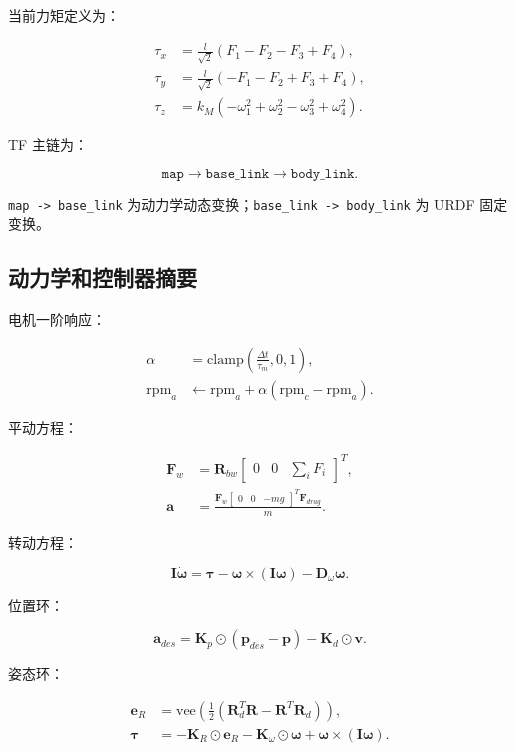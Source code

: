 \documentclass[UTF8,a4paper,12pt,fontset=fandol]{ctexart}
\newcommand{\code}[1]{\texttt{#1}}
\begin{document}
当前力矩定义为：

\begin{align}
\tau_x &= \frac{l}{\sqrt{2}}(F_1-F_2-F_3+F_4),\\
\tau_y &= \frac{l}{\sqrt{2}}(-F_1-F_2+F_3+F_4),\\
\tau_z &= k_M(-\omega_1^2+\omega_2^2-\omega_3^2+\omega_4^2).
\end{align}

TF 主链为：

\[
\code{map} \longrightarrow \code{base\_link} \longrightarrow \code{body\_link}.
\]

\code{map -> base\_link} 为动力学动态变换；\code{base\_link -> body\_link} 为 URDF 固定变换。

\subsection{动力学和控制器摘要}

电机一阶响应：

\begin{align}
\alpha &= \mathrm{clamp}\left(\frac{\Delta t}{\tau_m},0,1\right),\\
\mathrm{rpm}_{a} &\leftarrow \mathrm{rpm}_{a}
 + \alpha(\mathrm{rpm}_{c}-\mathrm{rpm}_{a}).
\end{align}

平动方程：

\begin{align}
\mathbf{F}_{w} &= \mathbf{R}_{bw}
\begin{bmatrix}0&0&\sum_iF_i\end{bmatrix}^{T},\\
\mathbf{a} &= \frac{\mathbf{F}_{w}
 \begin{bmatrix}0&0&-mg\end{bmatrix}^{T}
 \mathbf{F}_{drag}}{m}.
\end{align}

转动方程：

\[
\mathbf{I}\dot{\boldsymbol{\omega}}
= \boldsymbol{\tau}
- \boldsymbol{\omega}\times(\mathbf{I}\boldsymbol{\omega})
- \mathbf{D}_{\omega}\boldsymbol{\omega}.
\]

位置环：

\[
\mathbf{a}_{des}
= \mathbf{K}_{p}\odot(\mathbf{p}_{des}-\mathbf{p})
- \mathbf{K}_{d}\odot\mathbf{v}.
\]

姿态环：

\begin{align}
\mathbf{e}_{R} &= \mathrm{vee}\left(
\frac{1}{2}(\mathbf{R}_{d}^{T}\mathbf{R}
-\mathbf{R}^{T}\mathbf{R}_{d})\right),\\
\boldsymbol{\tau} &= -\mathbf{K}_{R}\odot\mathbf{e}_{R}
-\mathbf{K}_{\omega}\odot\boldsymbol{\omega}
+\boldsymbol{\omega}\times(\mathbf{I}\boldsymbol{\omega}).
\end{align}
\end{document}

